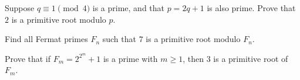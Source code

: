 \begin{problem}
	Suppose $q\equiv 1\pmod 4$ is a prime, and that $p=2q+1$ is also prime. Prove that $2$ is a primitive root modulo $p$. %
\end{problem}



\begin{problem}
	Find all Fermat primes $F_n$ such that $7$ is a primitive root modulo $F_n$. %
\end{problem}

%

\begin{problem}
	Prove that if $F_{m}=2^{2^{m}}+1$ is a prime with $m\geq{1}$, then $3$ is a primitive root of $F_{m}$. %
\end{problem}

%

